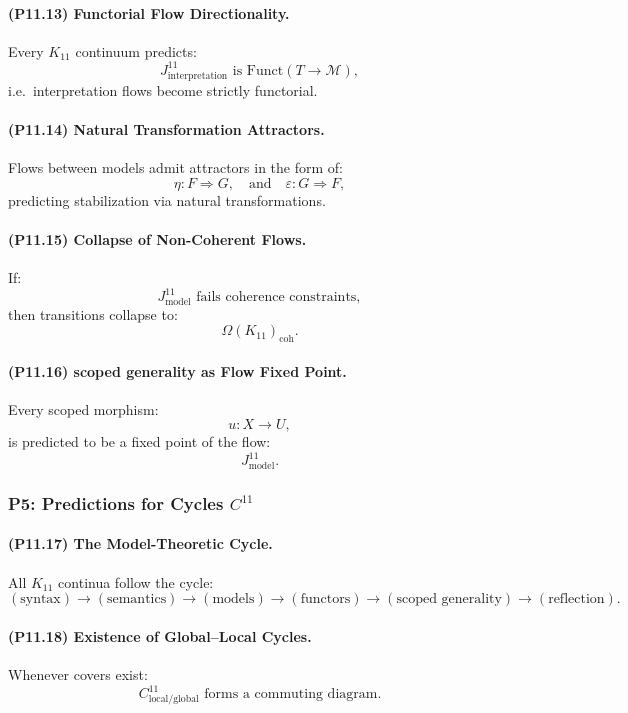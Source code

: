 \paragraph{(P11.13) Functorial Flow Directionality.}
Every $K_{11}$ continuum predicts:
\[
J_{\mathrm{interpretation}}^{11}
\text{ is } \mathrm{Funct}(T \to \mathcal{M}),
\]
i.e.\ interpretation flows become strictly functorial.

\paragraph{(P11.14) Natural Transformation Attractors.}
Flows between models admit attractors in the form of:
\[
\eta: F \Rightarrow G,
\quad\text{and}\quad
\varepsilon: G \Rightarrow F,
\]
predicting stabilization via natural transformations.

\paragraph{(P11.15) Collapse of Non-Coherent Flows.}
If:
\[
J_{\mathrm{model}}^{11}
\text{ fails coherence constraints},
\]
then transitions collapse to:
\[
\Omega(K_{11})_{\mathrm{coh}}.
\]

\paragraph{(P11.16) scoped generality as Flow Fixed Point.}
Every scoped morphism:
\[
u: X \to U,
\]
is predicted to be a fixed point of the flow:
\[
J_{\mathrm{model}}^{11}.
\]

\subsubsection{P5: Predictions for Cycles $C^{11}$}

\paragraph{(P11.17) The Model-Theoretic Cycle.}
All $K_{11}$ continua follow the cycle:
\[
(\text{syntax}) \to (\text{semantics}) 
\to (\text{models}) \to (\text{functors})
\to (\text{scoped generality}) \to (\text{reflection}).
\]

\paragraph{(P11.18) Existence of Global–Local Cycles.}
Whenever covers exist:
\[
C_{\mathrm{local/global}}^{11}
\text{ forms a commuting diagram.}
\]

